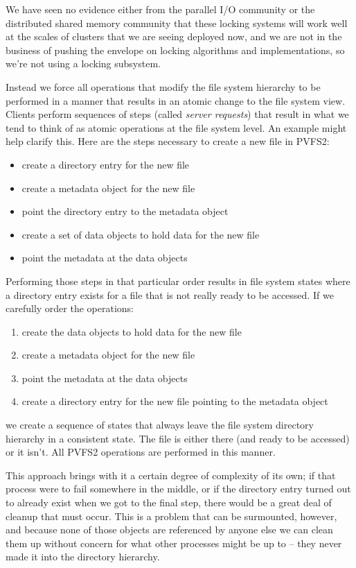 We have seen no evidence either from the parallel I/O community or the
distributed shared memory community that these locking systems will work well
at the scales of clusters that we are seeing deployed now, and we are not in
the business of pushing the envelope on locking algorithms and
implementations, so we're not using a locking subsystem.

Instead we force all operations that modify the file system hierarchy to be
performed in a manner that results in an atomic change to the file system
view.  Clients perform sequences of steps (called \emph{server requests}) that
result in what we tend to think of as atomic operations at the file system
level.  An example might help clarify this.  Here are the steps necessary to
create a new file in PVFS2:
\begin{itemize}
\item create a directory entry for the new file
\item create a metadata object for the new file
\item point the directory entry to the metadata object
\item create a set of data objects to hold data for the new file
\item point the metadata at the data objects
\end{itemize}
Performing those steps in that particular order results in file system states
where a directory entry exists for a file that is not really ready to be
accessed.  If we carefully order the operations:
\begin{enumerate}
\item create the data objects to hold data for the new file
\item create a metadata object for the new file
\item point the metadata at the data objects
\item create a directory entry for the new file pointing to the metadata
      object
\end{enumerate}
we create a sequence of states that always leave the file system
directory hierarchy in a consistent state.  The file is either there (and
ready to be accessed) or it isn't.  All PVFS2 operations are performed in this
manner.

This approach brings with it a certain degree of complexity of its own; if
that process were to fail somewhere in the middle, or if the directory entry
turned out to already exist when we got to the final step, there would be a
great deal of cleanup that must occur.  This is a problem that can be
surmounted, however, and because none of those objects are referenced by
anyone else we can clean them up without concern for what other processes
might be up to -- they never made it into the directory hierarchy.
